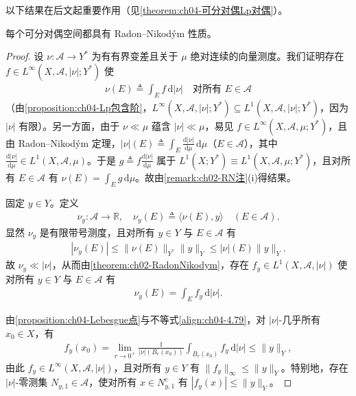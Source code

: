 \documentclass[../../main.tex]{subfiles}%
\begin{document}
以下结果在后文起重要作用（见\cref{theorem:ch04-可分对偶Lp对偶}）。

\begin{theorem}\label{theorem:ch04-DunfordPettis}\label{proposition:ch04-收敛子列}
每个可分对偶空间都具有 Radon--Nikodým 性质。
\end{theorem}

\begin{proof}
设 $\nu:\mathcal{A}\to Y^*$ 为有有界变差且关于 $\mu$ 绝对连续的向量测度。我们证明存在 $f\in L^\infty(X,\mathcal{A},|\nu|;Y^*)$ 使
\begin{align}
\nu(E)\triangleq \int_E f\,\mathrm{d}|\nu|\quad\text{对所有 }E\in\mathcal{A} \label{align:ch04-4.77}
\end{align}
（由\cref{proposition:ch04-Lp包含阶}，$L^\infty(X,\mathcal{A},|\nu|;Y^*)\subseteq L^1(X,\mathcal{A},|\nu|;Y^*)$，因为 $|\nu|$ 有限）。另一方面，由于 $\nu\ll\mu$ 蕴含 $|\nu|\ll\mu$，易见 $f\in L^\infty(X,\mathcal{A},\mu;Y^*)$，且由 Radon--Nikodým 定理，$|\nu|(E)\triangleq \int_E\frac{\mathrm{d}|\nu|}{\mathrm{d}\mu}\,\mathrm{d}\mu$（$E\in\mathcal{A}$），其中 $\frac{\mathrm{d}|\nu|}{\mathrm{d}\mu}\in L^1(X,\mathcal{A},\mu)$。于是 $g\triangleq f\frac{\mathrm{d}|\nu|}{\mathrm{d}\mu}$ 属于 $L^1(X;Y^*)\equiv L^1(X,\mathcal{A},\mu;Y^*)$，且对所有 $E\in\mathcal{A}$ 有 $\nu(E)=\int_E g\,\mathrm{d}\mu$。故由\cref{remark:ch02-RN注}(i)得结果。

固定 $y\in Y$。定义
\begin{align}
\nu_y:\mathcal{A}\to\mathbb{R},\quad \nu_y(E)\triangleq \langle\nu(E),y\rangle\quad(E\in\mathcal{A}). \label{align:ch04-4.78}
\end{align}
显然 $\nu_y$ 是有限带号测度，且对所有 $y\in Y$ 与 $E\in\mathcal{A}$ 有
\begin{align}
|\nu_y(E)|\leqslant\|\nu(E)\|_{Y^*}\|y\|_Y\leqslant|\nu|(E)\|y\|_Y. \label{align:ch04-4.79}
\end{align}
故 $\nu_y\ll|\nu|$，从而由\cref{theorem:ch02-RadonNikodym}，存在 $f_y\in L^1(X,\mathcal{A},|\nu|)$ 使对所有 $y\in Y$ 与 $E\in\mathcal{A}$ 有
\begin{align}
\nu_y(E)=\int_E f_y\,\mathrm{d}|\nu|. \label{align:ch04-4.80}
\end{align}

由\cref{proposition:ch04-Lebesgue点}与不等式\eqref{align:ch04-4.79}，对 $|\nu|$-几乎所有 $x_0\in X$，有
\begin{align*}
f_y(x_0)=\lim_{r\to0^+}\frac1{|\nu|(B_r(x_0))}\int_{B_r(x_0)}f_y\,\mathrm{d}|\nu|\leqslant\|y\|_Y,
\end{align*}
由此 $f_y\in L^\infty(X,\mathcal{A},|\nu|)$，且对所有 $y\in Y$ 有 $\|f_y\|_\infty\leqslant\|y\|_Y$。特别地，存在 $|\nu|$-零测集 $N_{y,1}\in\mathcal{A}$，使对所有 $x\in N_{y,1}^c$ 有 $|f_y(x)|\leqslant\|y\|_Y$。


\end{proof}
\end{document}
